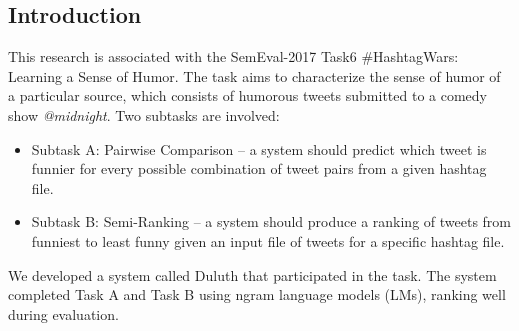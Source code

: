 \documentclass[a0,portrait]{a0poster}
\begin{document}
\begin{multicols}{2} %



 


\color{SaddleBrown} %

\section*{\LARGE Introduction}
This research is associated with the SemEval-2017 Task6 \#HashtagWars: Learning a Sense of Humor. The task aims to characterize the sense of humor of a particular source, which consists of humorous tweets submitted to a comedy show \textit{@midnight}. Two subtasks are involved: 
\begin{itemize}
\item Subtask A: Pairwise Comparison -- a system should predict which tweet is funnier for every possible combination of tweet pairs from a given hashtag file.
\item Subtask B: Semi-Ranking -- a system should produce a ranking of tweets from funniest to least funny given an input file of tweets for a specific hashtag file. 
\end{itemize}
We developed a system called Duluth that participated in the task. The system completed Task A and Task B using ngram language models (LMs), ranking well during evaluation.


\color{DarkSlateGray} %


\end{multicols}
\end{document}
